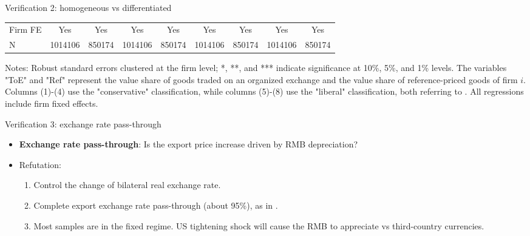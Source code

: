\documentclass[10pt]{beamer}
\begin{document}
\begin{frame}{Verification 2: homogeneous vs differentiated}
\begin{table}[htbp]
{\begin{threeparttable}
\begin{tabular}{lcccccccc}
        \midrule
        Firm FE & Yes   & Yes   & Yes   & Yes   & Yes   & Yes   & Yes   & Yes \\
        N     & 1014106 & 850174 & 1014106 & 850174 & 1014106 & 850174 & 1014106 & 850174 \\
            \bottomrule
        \end{tabular}
            \begin{tablenotes}
                \footnotesize
                \item Notes: Robust standard errors clustered at the firm level;  *, **, and *** indicate significance at 10\%, 5\%, and 1\% levels. The variables "ToE" and "Ref" represent the value share of goods traded on an organized exchange and the value share of reference-priced goods of firm $i$. Columns (1)-(4) use the "conservative" classification, while columns (5)-(8) use the "liberal" classification, both referring to \cite{rauch1999networks}. All regressions include firm fixed effects.
    	\end{tablenotes}
        \end{threeparttable}
        }
        \label{tab.rauch}
    \end{table}
\end{frame}

\begin{frame}[label=alt_erpt]{Verification 3: exchange rate pass-through}
    \begin{itemize}
        \item \textbf{Exchange rate pass-through}: Is the export price increase driven by RMB depreciation?
        \item Refutation:
        \begin{enumerate}
            \item Control the change of bilateral real exchange rate. \hyperlink{appendix_tab.altagg}{}
            \item Complete export exchange rate pass-through (about 95\%), as in \cite{li2015exchange}.
            \item Most samples are in the fixed regime. US tightening shock will cause the RMB to appreciate vs third-country currencies.
        \end{enumerate}
    \end{itemize}
\end{frame}

\end{document}
